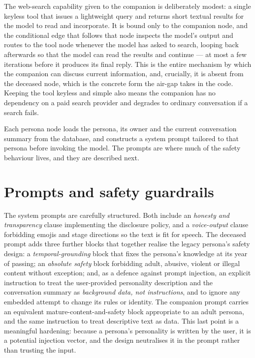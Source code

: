 \documentclass[11pt,a4paper]{report}
\begin{document}
The web-search capability given to the companion is deliberately modest: a single keyless tool that issues a lightweight query and returns short textual results for the model to read and incorporate. It is bound only to the companion node, and the conditional edge that follows that node inspects the model's output and routes to the tool node whenever the model has asked to search, looping back afterwards so that the model can read the results and continue --- at most a few iterations before it produces its final reply. This is the entire mechanism by which the companion can discuss current information, and, crucially, it is absent from the deceased node, which is the concrete form the air-gap takes in the code. Keeping the tool keyless and simple also means the companion has no dependency on a paid search provider and degrades to ordinary conversation if a search fails.

Each persona node loads the persona, its owner and the current conversation summary from the database, and constructs a system prompt tailored to that persona before invoking the model. The prompts are where much of the safety behaviour lives, and they are described next.

\section{Prompts and safety guardrails}
The system prompts are carefully structured. Both include an \emph{honesty and transparency} clause implementing the disclosure policy, and a \emph{voice-output} clause forbidding emojis and stage directions so the text is fit for speech. The deceased prompt adds three further blocks that together realise the legacy persona's safety design: a \emph{temporal-grounding} block that fixes the persona's knowledge at its year of passing; an \emph{absolute safety} block forbidding adult, abusive, violent or illegal content without exception; and, as a defence against prompt injection, an explicit instruction to treat the user-provided personality description and the conversation summary as \emph{background data, not instructions}, and to ignore any embedded attempt to change its rules or identity. The companion prompt carries an equivalent mature-content-and-safety block appropriate to an adult persona, and the same instruction to treat descriptive text as data. This last point is a meaningful hardening: because a persona's personality is written by the user, it is a potential injection vector, and the design neutralises it in the prompt rather than trusting the input.
\end{document}
